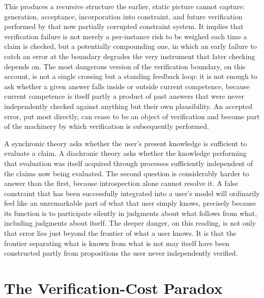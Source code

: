 \documentclass[11pt]{article}
\begin{document}
This produces a recursive structure the earlier, static picture cannot capture: generation, acceptance, incorporation into constraint, and future verification performed by that now partially corrupted constraint system. It implies that verification failure is not merely a per-instance risk to be weighed each time a claim is checked, but a potentially compounding one, in which an early failure to catch an error at the boundary degrades the very instrument that later checking depends on. The most dangerous version of the verification boundary, on this account, is not a single crossing but a standing feedback loop: it is not enough to ask whether a given answer falls inside or outside current competence, because current competence is itself partly a product of past answers that were never independently checked against anything but their own plausibility. An accepted error, put most directly, can cease to be an object of verification and become part of the machinery by which verification is subsequently performed.

A synchronic theory asks whether the user's present knowledge is sufficient to evaluate a claim. A diachronic theory asks whether the knowledge performing that evaluation was itself acquired through processes sufficiently independent of the claims now being evaluated. The second question is considerably harder to answer than the first, because introspection alone cannot resolve it. A false constraint that has been successfully integrated into a user's model will ordinarily feel like an unremarkable part of what that user simply knows, precisely because its function is to participate silently in judgments about what follows from what, including judgments about itself. The deeper danger, on this reading, is not only that error lies just beyond the frontier of what a user knows. It is that the frontier separating what is known from what is not may itself have been constructed partly from propositions the user never independently verified.

\section{The Verification-Cost Paradox}
\end{document}
